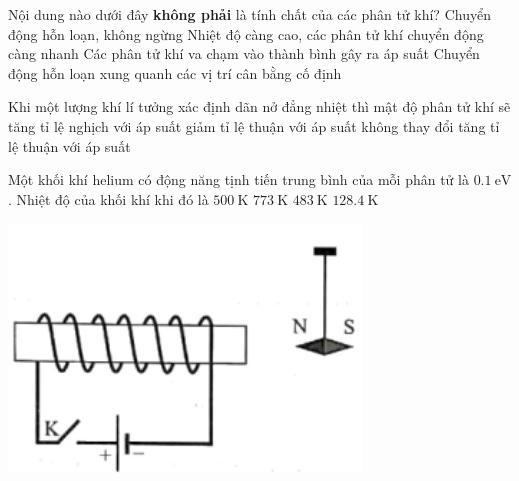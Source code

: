 \begin{ex}
Nội dung nào dưới đây \textbf{không phải} là tính chất của các phân tử khí?	
	\choice
	{Chuyển động hỗn loạn, không ngừng}
	{Nhiệt độ càng cao, các phân tử khí chuyển động càng nhanh}
	{Các phân tử khí va chạm vào thành bình gây ra áp suất}
	{\True Chuyển động hỗn loạn xung quanh các vị trí cân bằng cố định}
	\loigiai{}
\end{ex}
\begin{ex}
	Khi một lượng khí lí tưởng xác định dãn nở đẳng nhiệt thì mật độ phân tử khí sẽ
	\choice
	{tăng tỉ lệ nghịch với áp suất}
	{\True giảm tỉ lệ thuận với áp suất}
	{không thay đổi}
	{tăng tỉ lệ thuận với áp suất}
	\loigiai{}
\end{ex}
\begin{ex}
	Một khối khí helium có động năng tịnh tiến trung bình của mỗi phân tử là $\SI{0.1}{\electronvolt}$. Nhiệt độ của khối khí khi đó là
	\choice
	{$\SI{500}{\kelvin}$}
	{\True $\SI{773}{\kelvin}$}
	{$\SI{483}{\kelvin}$}
	{$\SI{128.4}{\kelvin}$}
\end{ex}
\begin{ex}
		{\vspace{-0.5cm}\includegraphics[scale=0.6]{../figs/FINAL-SEM1-004-2}}
	\loigiai{}
\end{ex}
